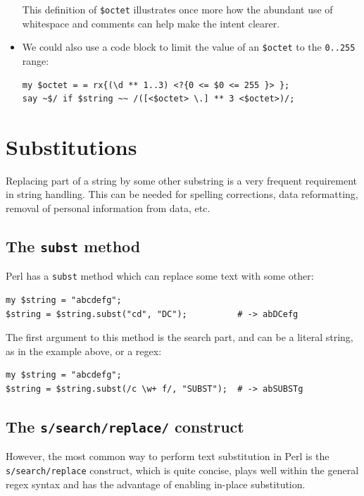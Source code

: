 \begin{itemize}
This definition of \verb'$octet' illustrates once more how 
the abundant use of whitespace and comments can help make 
the intent clearer.

\item We could also use 
a code block to limit the value of an \verb'$octet' to 
the \verb'0..255' range:

\begin{verbatim}
my $octet = = rx{(\d ** 1..3) <?{0 <= $0 <= 255 }> };
say ~$/ if $string ~~ /([<$octet> \.] ** 3 <$octet>)/;
\end{verbatim}
%

\end{itemize}


\section{Substitutions}
\label{substitutions}

Replacing part of a string by some other substring  is a 
very frequent requirement in string handling. This can be 
needed for spelling corrections, data reformatting, removal 
of personal information from data, etc. 

\subsection{The {\tt subst} method}

Perl has a {\tt subst} method which can replace some text with 
some other:

\begin{verbatim}
my $string = "abcdefg";
$string = $string.subst("cd", "DC");          # -> abDCefg
\end{verbatim}

The first argument to this method is the search part, and 
can be a literal string, as in the example above, or a regex:

\begin{verbatim}
my $string = "abcdefg";
$string = $string.subst(/c \w+ f/, "SUBST");  # -> abSUBSTg
\end{verbatim}

\subsection{The {\tt s/search/replace/} construct}

However, the most common way to perform text substitution 
in Perl is the \verb's/search/replace' construct, which 
is quite concise, plays well within the general regex syntax
and has the advantage of enabling in-place substitution.

